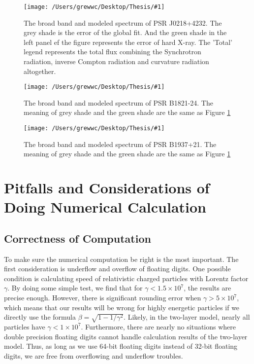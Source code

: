\documentclass[12pt]{report}
\newcommand{\singleFig}[3]{
  \begin{figure}[!ht]
    \centering
    \texttt{[image: /Users/grewwc/Desktop/Thesis/\#1]}
    \caption{#3}
    \label{fig: #1}
  \end{figure}
}
\begin{document}
        \singleFig{j0218_twolayer_all.png}{0.37}{The broad band and modeled spectrum of PSR J0218+4232.
          The grey shade is the error of the global fit. And the green shade in the left panel ef the 
          figure represents the error of hard X-ray. The 'Total' legend represents the total flux 
          combining the Synchrotron radiation, inverse Compton radiation and curvature radiation
          altogether.}
        \vspace{0.5cm} 
        
        \singleFig{b1821_twolayer_all.png}{0.37}{The broad band and modeled spectrum of PSR B1821-24.
          The meaning of grey shade and the green shade are the same as Figure \ref{fig: j0218_twolayer_all.png}}
        \vspace{0.5cm} 
          
        \singleFig{j1939_twolayer_all.png}{0.39}{The broad band and modeled spectrum of PSR B1937+21.
          The meaning of grey shade and the green shade are the same as Figure
          \ref{fig: j0218_twolayer_all.png}}
        \vspace{0.5cm}        

      \section{Pitfalls and Considerations of Doing Numerical Calculation}
        \subsection{Correctness of Computation}
          To make sure the numerical computation be right is the most important. 
          The first consideration is underflow and overflow of floating digits.
          One possible condition is calculating speed of relativistic charged particles with 
          Lorentz factor $\gamma$. By doing some simple test, we find that for 
          $\gamma < 1.5\times 10^7$, the results are precise enough. However, there is significant rounding error
          when $\gamma > 5\times 10^7$, which means that our results will be wrong for highly 
          energetic particles if we directly use the formula $\beta = \sqrt{1 - 1/\gamma^2}$.
          Likely, in the two-layer model, nearly all particles have $\gamma < 1\times 10^7$. 
          Furthermore, there are nearly no situations where double precision floating digits
          cannot handle calculation results of the two-layer model. Thus, as long as we use 
          64-bit floating digits instead of 32-bit floating digits, we are free from overflowing 
          and underflow troubles. 
            
\end{document}
